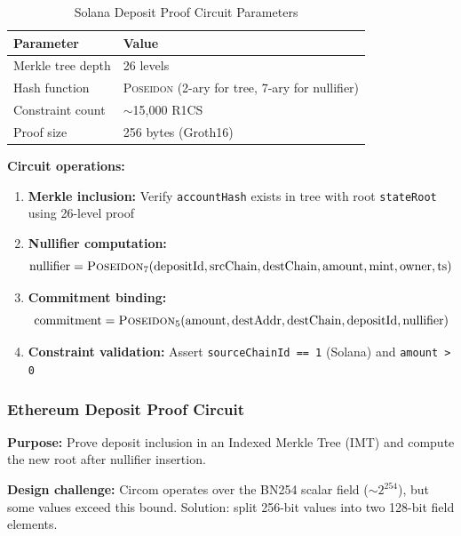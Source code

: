 \documentclass[11pt,a4paper,twoside]{article}
\newcommand{\poseidon}{\textsc{Poseidon}}
\begin{document}
\begin{table}[H]
\centering
\caption{Solana Deposit Proof Circuit Parameters}
\label{tab:sol-circuit}
\begin{tabular}{@{}ll@{}}
\toprule
\textbf{Parameter} & \textbf{Value} \\
\midrule
Merkle tree depth & 26 levels \\
Hash function & \poseidon{} (2-ary for tree, 7-ary for nullifier) \\
Constraint count & $\sim$15,000 R1CS \\
Proof size & 256 bytes (Groth16) \\
\bottomrule
\end{tabular}
\end{table}

\textbf{Circuit operations:}
\begin{enumerate}
    \item \textbf{Merkle inclusion:} Verify \texttt{accountHash} exists in tree with root \texttt{stateRoot} using 26-level proof
    \item \textbf{Nullifier computation:}
    \begin{equation*}
    \text{nullifier} = \poseidon_7(\text{depositId}, \text{srcChain}, \text{destChain}, \text{amount}, \text{mint}, \text{owner}, \text{ts})
    \end{equation*}
    \item \textbf{Commitment binding:}
    \begin{equation*}
    \text{commitment} = \poseidon_5(\text{amount}, \text{destAddr}, \text{destChain}, \text{depositId}, \text{nullifier})
    \end{equation*}
    \item \textbf{Constraint validation:} Assert \texttt{sourceChainId == 1} (Solana) and \texttt{amount > 0}
\end{enumerate}

\subsubsection{Ethereum Deposit Proof Circuit}

\textbf{Purpose:} Prove deposit inclusion in an Indexed Merkle Tree (IMT) and compute the new root after nullifier insertion.

\textbf{Design challenge:} Circom operates over the BN254 scalar field ($\sim 2^{254}$), but some values exceed this bound. Solution: split 256-bit values into two 128-bit field elements.
\end{document}
